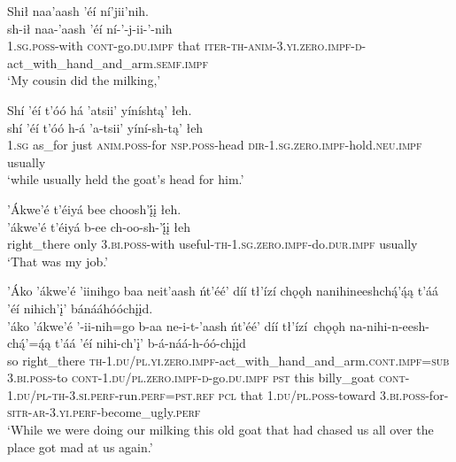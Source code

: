 \ea\label{ex:text6-9-9}
Shił naa’aash ’éí ní’jii’nih.\\
\gll sh-ił	naa-’aash	’éí	ní-’-j-ii-’-nih\\
     1.\textsc{sg}.\textsc{poss}-with	\textsc{cont}-go.\textsc{du}.\textsc{impf}	that	\textsc{iter}-\textsc{th}-\textsc{anim}-3.\textsc{yi}.\textsc{zero}.\textsc{impf}-\textsc{d}-act\_with\_hand\_and\_arm.\textsc{semf}.\textsc{impf}\\
\glt `My cousin did the milking,'
\z

\ea\label{ex:text6-9-10}
Shí ’éí t’óó há ’atsii’ yíníshtą’ łeh.\\
\gll shí	’éí	t’óó	h-á	’a-tsii’	yíní-sh-tą’	łeh\\
     1.\textsc{sg}	as\_for	just	\textsc{anim}.\textsc{poss}-for	\textsc{nsp}.\textsc{poss}-head	\textsc{dir}-1.\textsc{sg}.\textsc{zero}.\textsc{impf}-hold.\textsc{neu}.\textsc{impf}	usually\\
\glt `while usually held the goat's head for him.'
\z

\newpage
\ea\label{ex:text6-9-11}
’Ákwe’é t’éiyá bee choosh’į́į łeh.\\
\gll ’ákwe’é	t’éiyá	b-ee	ch-oo-sh-’į́į	łeh\\
     right\_there	only	3.\textsc{bi}.\textsc{poss}-with	useful-\textsc{th}-1.\textsc{sg}.\textsc{zero}.\textsc{impf}-do.\textsc{dur}.\textsc{impf}	usually\\
\glt `That was my job.'
\z

\ea\label{ex:text6-9-12}
’Áko ’ákwe’é ’iinihgo baa neit’aash ńt’éé’ díí tł’ízí chǫǫh nanihineeshchą́’ą́ą t’áá ’éí nihich’į’ bánááhóóchįįd.\\
\gll ’áko	’ákwe’é	’-ii-nih=go	b-aa	ne-i-t-’aash	ńt’éé’	díí	tł’ízí~{chǫǫh}	na-nihi-n-eesh-chą́’=ą́ą	t’áá ’éí	nihi-ch’į’	b-á-náá-h-óó-chįįd\\
     so	right\_there	\textsc{th}-1.\textsc{du}/\textsc{pl}.\textsc{yi}.\textsc{zero}.\textsc{impf}-act\_with\_hand\_and\_arm.\textsc{cont}.\textsc{impf}=\textsc{sub}	3.\textsc{bi}.\textsc{poss}-to	\textsc{cont}-1.\textsc{du}/\textsc{pl}.\textsc{zero}.\textsc{impf}-\textsc{d}-go.\textsc{du}.\textsc{impf}	\textsc{pst}	this	billy\_goat	\textsc{cont}-1.\textsc{du}/\textsc{pl}-\textsc{th}-3.\textsc{si}.\textsc{perf}-run.\textsc{perf}=\textsc{pst}.\textsc{ref}	\textsc{pcl} that	1.\textsc{du}/\textsc{pl}.\textsc{poss}-toward	3.\textsc{bi}.\textsc{poss}-for-\textsc{sitr}-\textsc{ar}-3.\textsc{yi}.\textsc{perf}-become\_ugly.\textsc{perf}\\
\glt `While we were doing our milking this old goat that had chased us all over the place got mad at us again.'
\z

